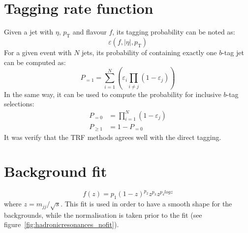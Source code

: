\documentclass[a4paper,11pt]{article}
\newcommand{\pt}{\ensuremath{p_{\text{T}}}}
\begin{document}
\section{Tagging rate function}
\label{sec:app:trf}
Given a jet with $\eta$, $\pt$ and flavour $f$, its tagging probability can be noted as:
\begin{equation*}
	\varepsilon \left(f,|\eta|,\pt\right)
\end{equation*}
\newline
For a given event with $N$ jets, its probability of containing exactly one $b$-tag jet can be computed as:
\begin{equation*}
	P_{=1} = \sum\limits_{i=1}^N \left( \varepsilon_{i} \prod\limits_{i \neq j} \left( 1 - \varepsilon_{j} \right) \right)
\end{equation*}
\newline
In the same way, it can be used to compute the probability for inclusive $b$-tag selections:
\begin{align*}
	P_{=0} &= \prod\limits_{i=1}^N \left( 1 - \varepsilon_{j} \right) \\
	P_{\geq 1} &= 1 - P_{=0}
\end{align*}
\newline
It was verify that the TRF methods agrees well with the direct tagging.


\section{Background fit}
\label{sec:app:bgfit}
\begin{equation}
f(z)=p_1(1-z)^{p_2}z^{p_3}z^{p_{4}logz}
\end{equation}
where $z=m_{jj}/\sqrt{s}$. This fit is used in order to have a smooth shape for the backgrounds, while the normalisation is taken prior to the fit (see figure~\ref{fig:hadronicresonances_nofit}).
\end{document}
